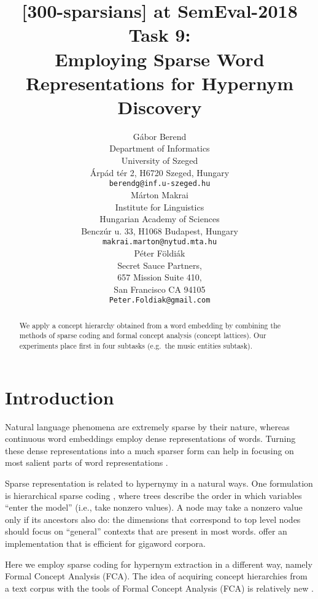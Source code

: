 \documentclass[11pt,a4paper]{article}
\title{[300-sparsians] at SemEval-2018 Task 9: \\ 
Employing Sparse Word Representations for Hypernym Discovery}
\author{Gábor Berend \\
Department of Informatics \\ University of Szeged \\
Árpád tér 2, H6720 Szeged, Hungary \\
{\tt berendg@inf.u-szeged.hu} \\\And
  Márton Makrai  \\ %
  Institute for Linguistics \\
  Hungarian Academy of Sciences \\
  Benczúr u. 33, H1068 Budapest, Hungary \\
  {\tt makrai.marton@nytud.mta.hu} \\\AND
  Péter Földiák \\
  Secret Sauce Partners, \\
  657 Mission Suite 410, \\ 
  San Francisco CA 94105 \\
  {\tt Peter.Foldiak@gmail.com} \\} %
\date{}
\begin{document}
\maketitle

\begin{abstract}
  We apply a concept hierarchy obtained from a word embedding by combining the
  methods of sparse coding and formal concept analysis (concept lattices).
  Our experiments place first in four subtasks (e.g.~the music entities
  subtask).
\end{abstract}

\section{Introduction}

Natural language phenomena are extremely sparse by their nature, whereas
continuous word embeddings employ dense representations of words. Turning
these dense representations into a much sparser form can help in focusing on
most salient parts of word representations
\citep{Faruqui:2015,Berend:2017,Subramanian:2018}.

Sparse representation is related to hypernymy in a natural ways.  
One formulation is hierarchical sparse coding \citep{Zhao:2009}, where trees
describe the order in which variables “enter the model” (i.e., take nonzero
values). A node may take a nonzero value only if its ancestors also do: the
dimensions that correspond to top level nodes should focus on “general”
contexts that are present in most words. \citep{Yogatama:2015} offer an
implementation that is efficient for gigaword corpora.  

Here we employ sparse coding for hypernym extraction in a different way, namely
Formal Concept Analysis (FCA).  The idea of acquiring concept hierarchies from
a text corpus with the tools of Formal Concept Analysis (FCA) is relatively new
\citep{Cimiano:2005}.

\newcommand{\ob}{\ensuremath{\mathcal O}}
\newcommand{\at}{\ensuremath{\mathcal A}}
\newcommand{\inci}{\ensuremath{\mathcal I}}
\newcommand{\oaconc}{\ensuremath{\langle O, A\rangle}}
\end{document}
